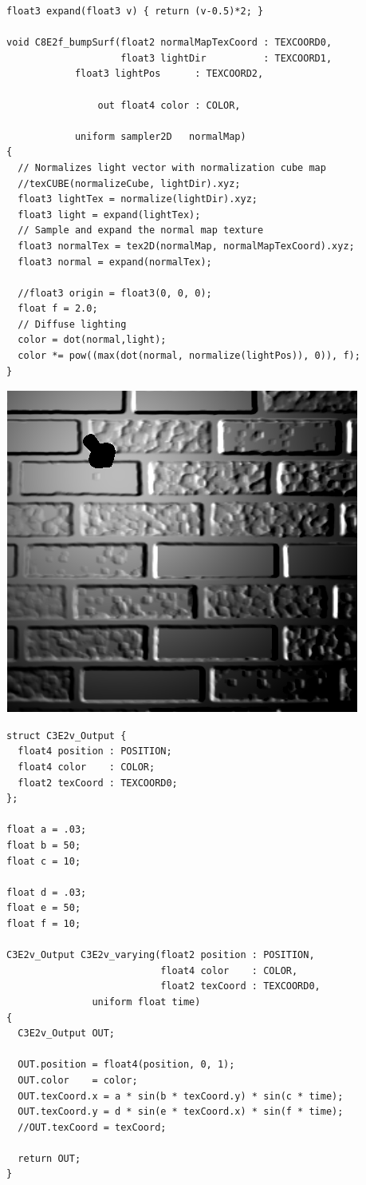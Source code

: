 \documentclass[letterpaper,11pt]{article}
\begin{document}
\begin{verbatim}
float3 expand(float3 v) { return (v-0.5)*2; }

void C8E2f_bumpSurf(float2 normalMapTexCoord : TEXCOORD0,
                    float3 lightDir          : TEXCOORD1,
		    float3 lightPos	     : TEXCOORD2,

                out float4 color : COLOR,

            uniform sampler2D   normalMap)
{
  // Normalizes light vector with normalization cube map
  //texCUBE(normalizeCube, lightDir).xyz;
  float3 lightTex = normalize(lightDir).xyz;
  float3 light = expand(lightTex);
  // Sample and expand the normal map texture	
  float3 normalTex = tex2D(normalMap, normalMapTexCoord).xyz;
  float3 normal = expand(normalTex);

  //float3 origin = float3(0, 0, 0);
  float f = 2.0;
  // Diffuse lighting
  color = dot(normal,light);
  color *= pow((max(dot(normal, normalize(lightPos)), 0)), f);
}
\end{verbatim}

\includegraphics[scale = .6]{HW3_4.png}

\begin{verbatim}
struct C3E2v_Output {
  float4 position : POSITION;
  float4 color    : COLOR;
  float2 texCoord : TEXCOORD0;
};

float a = .03;
float b = 50;
float c = 10;

float d = .03;
float e = 50;
float f = 10;

C3E2v_Output C3E2v_varying(float2 position : POSITION,
                           float4 color    : COLOR,
                           float2 texCoord : TEXCOORD0,
			   uniform float time)
{
  C3E2v_Output OUT;

  OUT.position = float4(position, 0, 1);
  OUT.color    = color;
  OUT.texCoord.x = a * sin(b * texCoord.y) * sin(c * time);
  OUT.texCoord.y = d * sin(e * texCoord.x) * sin(f * time);
  //OUT.texCoord = texCoord;

  return OUT;	
}
\end{verbatim}
\end{document}
